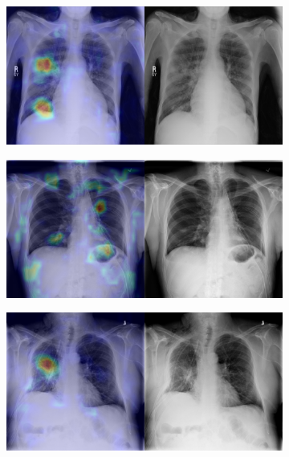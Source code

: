 \begin{figure}[b]
    \centering
    \begin{subfigure}{0.4\textwidth}
        \centering
        \includegraphics[width=1.0\textwidth]{Chapters/5. Conclusiones/img/Pneumonia/1_1_8cf6c451-dd08-4054-a52c-743a4236a058.png}
    \end{subfigure}
    \begin{subfigure}{0.4\textwidth}
        \centering
        \includegraphics[width=1.0\textwidth]{Chapters/5. Conclusiones/img/Pneumonia/1_1_6f37008d-c8a4-45b0-a1cd-7b215df62cfc.png}
    \end{subfigure}
    \begin{subfigure}{0.4\textwidth}
        \centering
        \includegraphics[width=1.0\textwidth]{Chapters/5. Conclusiones/img/Pneumonia/1_1_3f2b878e-9e3b-410b-a739-b43d81b98692.png}

\end{subfigure}
\end{figure}
